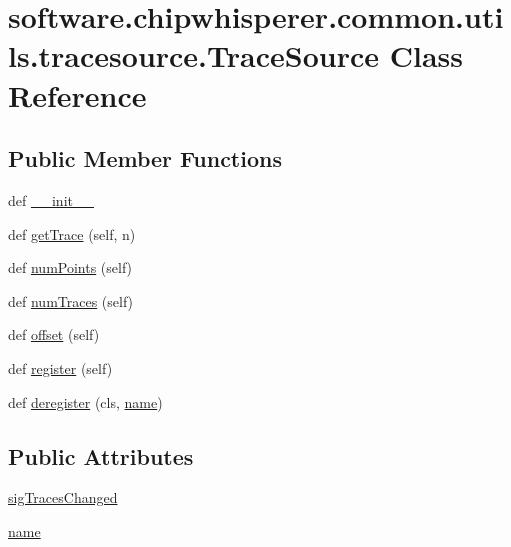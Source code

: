 \hypertarget{classsoftware_1_1chipwhisperer_1_1common_1_1utils_1_1tracesource_1_1TraceSource}{}\section{software.\+chipwhisperer.\+common.\+utils.\+tracesource.\+Trace\+Source Class Reference}
\label{classsoftware_1_1chipwhisperer_1_1common_1_1utils_1_1tracesource_1_1TraceSource}
\subsection*{Public Member Functions}
\begin{DoxyCompactItemize}
\item 
def \hyperlink{classsoftware_1_1chipwhisperer_1_1common_1_1utils_1_1tracesource_1_1TraceSource_a857346bc3719161ab56d5a8e7c4fefdc}{\+\_\+\+\_\+init\+\_\+\+\_\+}
\item 
def \hyperlink{classsoftware_1_1chipwhisperer_1_1common_1_1utils_1_1tracesource_1_1TraceSource_a1b48e8173be2027b8065c1de807fa828}{get\+Trace} (self, n)
\item 
def \hyperlink{classsoftware_1_1chipwhisperer_1_1common_1_1utils_1_1tracesource_1_1TraceSource_a8dda4941954d8c70c92889664a15142a}{num\+Points} (self)
\item 
def \hyperlink{classsoftware_1_1chipwhisperer_1_1common_1_1utils_1_1tracesource_1_1TraceSource_af4b0a4c0f1e1d63e0894024cd78da99c}{num\+Traces} (self)
\item 
def \hyperlink{classsoftware_1_1chipwhisperer_1_1common_1_1utils_1_1tracesource_1_1TraceSource_ac38aedee8f69e0d20c143c507e92cb24}{offset} (self)
\item 
def \hyperlink{classsoftware_1_1chipwhisperer_1_1common_1_1utils_1_1tracesource_1_1TraceSource_ae5c170314ed59751b21999e6d72df384}{register} (self)
\item 
def \hyperlink{classsoftware_1_1chipwhisperer_1_1common_1_1utils_1_1tracesource_1_1TraceSource_a982881a5a0e6f7fdfaecd18b3f1f349f}{deregister} (cls, \hyperlink{classsoftware_1_1chipwhisperer_1_1common_1_1utils_1_1tracesource_1_1TraceSource_ac0cca65345519c525e20630288a6faa4}{name})
\end{DoxyCompactItemize}
\subsection*{Public Attributes}
\begin{DoxyCompactItemize}
\item 
\hyperlink{classsoftware_1_1chipwhisperer_1_1common_1_1utils_1_1tracesource_1_1TraceSource_ab0c62f8fad1e457c72d44e62a542f3e9}{sig\+Traces\+Changed}
\item 
\hyperlink{classsoftware_1_1chipwhisperer_1_1common_1_1utils_1_1tracesource_1_1TraceSource_ac0cca65345519c525e20630288a6faa4}{name}
\end{DoxyCompactItemize}
